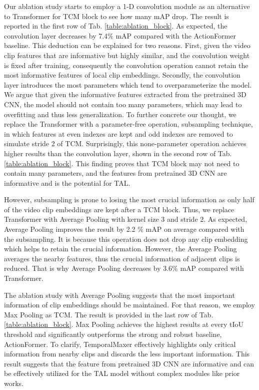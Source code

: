 \documentclass[10pt,twocolumn,letterpaper]{article}
\begin{document}
Our ablation study starts to employ a 1-D convolution module as an alternative to Transformer \cite{vaswani2017attention} for TCM block to see how many mAP drop. The result is reported in the first row of Tab. \ref{table:ablation_block}. As expected, the convolution layer decreases by 7.4\% mAP compared with the ActionFormer baseline. This deduction can be explained for two reasons. First, given the video clip features that are informative but highly similar, and the convolution weight is fixed after training, consequently the convolution operation cannot retain the most informative features of local clip embeddings. Secondly, the convolution layer introduces the most parameters which tend to overparameterize the model. We argue that given the informative features extracted from the pretrained 3D CNN, the model should not contain too many parameters, which may lead to overfitting and thus less generalization. To further concrete our thought, we replace the Transformer with a parameter-free operation, subsampling technique, in which features at even indexes are kept and odd indexes are removed to simulate stride 2 of TCM. Surprisingly, this none-parameter operation achieves higher results than the convolution layer, shown in the second row of Tab. \ref{table:ablation_block}. This finding proves that TCM block may not need to contain many parameters, and the features from pretrained 3D CNN are informative and is the potential for TAL.

However, subsampling is prone to losing the most crucial information as only half of the video clip embeddings are kept after a TCM block. Thus, we replace Transformer with Average Pooling with kernel size 3 and stride 2. As expected, Average Pooling improves the result by 2.2 \% mAP on average compared with the subsampling. It is because this operation does not drop any clip embedding which helps to retain the crucial information. However, the Average Pooling averages the nearby features, thus the crucial information of adjacent clips is reduced. That is why Average Pooling decreases by 3.6\% mAP compared with Transformer.

The ablation study with Average Pooling suggests that the most important information of clip embeddings should be maintained. For that reason, we employ Max Pooling as TCM. The result is provided in the last row of Tab. \ref{table:ablation_block}. Max Pooling achieves the highest results at every tIoU threshold and significantly outperforms the strong and robust baseline, ActionFormer. To clarify, TemporalMaxer effectively highlights only critical information from nearby clips and discards the less important information. This result suggests that the feature from pretrained 3D CNN are informative and can be effectively utilized for the TAL model without complex modules like prior works.
\end{document}
